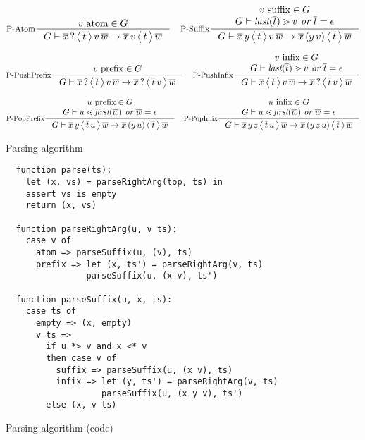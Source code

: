 \documentclass{article}
\begin{document}
\begin{figure}
  \[
  \inference[P-Atom]
    {\hasfix{v}{\atom}{G}}
    {\sstep{G}
      {\qstate{\seq{x}}{\seq{t}}{v\,\seq{w}}}
      {\state{\seq{x}\,v}{\seq{t}}{\seq{w}}}}
  \quad
  \inference[P-Suffix]
    {\hasfix{v}{\suffix{}{}}{G} \\
     \sgd{G}{\textit{last}(\seq{t})}{v} \textit{ or } \seq{t}=\epsilon}
    {\sstep{G}
      {\state{\seq{x}\,y}{\seq{t}}{v\,\seq{w}}}
      {\state{\seq{x}\,(y\,v)}{\seq{t}}{\seq{w}}}}
  \]

  \[
  \inference[P-PushPrefix]
    {\hasfix{v}{\prefix{}{}}{G}}
    {\sstep{G}
      {\qstate{\seq{x}}{\seq{t}}{v\,\seq{w}}}
      {\qstate{\seq{x}}{\seq{t}\,v}{\seq{w}}}}
  \quad
  \inference[P-PushInfix]
    {\hasfix{v}{\infix{}{}}{G} \\
     \sgd{G}{\textit{last}(\seq{t})}{v} \textit{ or } \seq{t}=\epsilon}
    {\sstep{G}
      {\state{\seq{x}}{\seq{t}}{v\,\seq{w}}}
      {\qstate{\seq{x}}{\seq{t}\,v}{\seq{w}}}}
  \]

  \[
  \inference[P-PopPrefix]
    {\hasfix{u}{\prefix{}{}}{G} \\
     \sld{G}{u}{\textit{first}(\seq{w})} \textit{ or } \seq{w}=\epsilon}
    {\sstep{G}
      {\state{\seq{x}\,y}{\seq{t}\,u}{\seq{w}}}
      {\state{\seq{x}\,(y\,u)}{\seq{t}}{\seq{w}}}}
  \quad
  \inference[P-PopInfix]
    {\hasfix{u}{\infix{}{}}{G} \\
     \sld{G}{u}{\textit{first}(\seq{w})} \textit{ or } \seq{w}=\epsilon}
    {\sstep{G}
      {\state{\seq{x}\,y\,z}{\seq{t}\,u}{\seq{w}}}
      {\state{\seq{x}\,(y\,z\,u)}{\seq{t}}{\seq{w}}}}
  \]

  \caption{Parsing algorithm}
\end{figure}

\begin{figure}
  \begin{lstlisting}
  function parse(ts):
    let (x, vs) = parseRightArg(top, ts) in
    assert vs is empty
    return (x, vs)

  function parseRightArg(u, v ts):
    case v of
      atom => parseSuffix(u, (v), ts)
      prefix => let (x, ts') = parseRightArg(v, ts)
                parseSuffix(u, (x v), ts')

  function parseSuffix(u, x, ts):
    case ts of
      empty => (x, empty)
      v ts =>
        if u *> v and x <* v
        then case v of
          suffix => parseSuffix(u, (x v), ts)
          infix => let (y, ts') = parseRightArg(v, ts)
                   parseSuffix(u, (x y v), ts')
        else (x, v ts)
  \end{lstlisting}

  \caption{Parsing algorithm (code)}
\end{figure}
\end{document}
